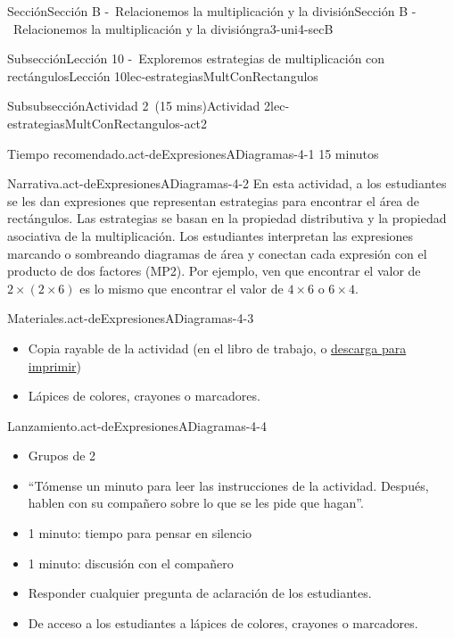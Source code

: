 \documentclass[oneside,10pt,]{article}
\begin{document}
\begin{sectionptx}{Sección}{Sección B -~Relacionemos la multiplicación y la división}{}{Sección B -~Relacionemos la multiplicación y la división}{}{}{gra3-uni4-secB}
\begin{subsectionptx}{Subsección}{Lección 10 -~Exploremos estrategias de multiplicación con rectángulos}{}{Lección 10}{}{}{lec-estrategiasMultConRectangulos}
\typeout{************************************************}
%
\begin{subsubsectionptx}{Subsubsección}{Actividad 2~(15 mins)}{}{Actividad 2}{}{}{lec-estrategiasMultConRectangulos-act2}
\par
\begin{paragraphs}{Tiempo recomendado.}{act-deExpresionesADiagramas-4-1}%
15 minutos%
\end{paragraphs}%
\begin{paragraphs}{Narrativa.}{act-deExpresionesADiagramas-4-2}%
En esta actividad, a los estudiantes se les dan expresiones que representan estrategias para encontrar el área de rectángulos. Las estrategias se basan en la propiedad distributiva y la propiedad asociativa de la multiplicación. Los estudiantes interpretan las expresiones marcando o sombreando diagramas de área y conectan cada expresión con el producto de dos factores (MP2). Por ejemplo, ven que encontrar el valor de \(2 \times (2 \times 6)\) es lo mismo que encontrar el valor de \(4 \times 6\) o \(6 \times 4\).%
\end{paragraphs}%
\begin{paragraphs}{Materiales.}{act-deExpresionesADiagramas-4-3}%
%
\begin{itemize}[label=\textbullet]
\item{}Copia rayable de la actividad (en el libro de trabajo, o \href{external/act-pdf/act-deExpresionesADiagramas.pdf}{descarga para imprimir}\footnotemark{})%
\item{}Lápices de colores, crayones o marcadores.%
\end{itemize}
\end{paragraphs}%
\begin{paragraphs}{Lanzamiento.}{act-deExpresionesADiagramas-4-4}%
%
\begin{itemize}[label=\textbullet]
\item{}Grupos de 2%
\item{}``Tómense un minuto para leer las instrucciones de la actividad. Después, hablen con su compañero sobre lo que se les pide que hagan''.%
\item{}1 minuto: tiempo para pensar en silencio%
\item{}1 minuto: discusión con el compañero%
\item{}Responder cualquier pregunta de aclaración de los estudiantes.%
\item{}De acceso a los estudiantes a lápices de colores, crayones o marcadores.%
\end{itemize}

\end{paragraphs}
\end{subsubsectionptx}
\end{subsectionptx}
\end{sectionptx}
\end{document}
